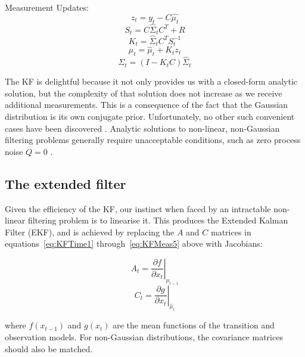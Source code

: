 Measurement Updates:
\begin{equation}
z_t = y_t - C \hat{\mu_t}
\label{eq:KFMeas1}
\end{equation}
\begin{equation}
S_t = C \hat{\Sigma}_t C^{T} + R
\label{eq:KFMeas2}
\end{equation}
\begin{equation}
K_t = \hat{\Sigma}_t C^{T} S_t^{-1}
\label{eq:KFMeas3}
\end{equation}
\begin{equation}
\mu_t = \hat{\mu}_t + K_t z_t
\label{eq:KFMeas4}
\end{equation}
\begin{equation}
\Sigma_t = (I - K_t C) \hat{\Sigma}_t
\label{eq:KFMeas5}
\end{equation}

The KF is delightful because it not only provides us with a closed-form analytic solution, but the complexity of that solution does not increase as we receive additional measurements. This is a consequence of the fact that the Gaussian distribution is its own conjugate prior. Unfortunately, no other such convenient cases have been discovered \cite{Daum2005}. Analytic solutions to non-linear, non-Gaussian filtering problems generally require unacceptable conditions, such as zero process noise $Q=0$ \cite{Daum2005}.

\subsection{The extended filter}

Given the efficiency of the KF, our instinct when faced by an intractable non-linear filtering problem is to linearise it. This produces the Extended Kalman Filter (EKF), and is achieved by replacing the $A$ and $C$ matrices in equations~\ref{eq:KFTime1} through~\ref{eq:KFMeas5} above with Jacobians:

\begin{equation}
A_t = \left . \frac{\partial f}{\partial x_t} \right \vert _{\mu_{t-1}}
\label{eq:EKF1}
\end{equation}
\begin{equation}
C_t = \left . \frac{\partial g}{\partial x_t} \right \vert _{\hat{\mu}_t}
\label{eq:EKF2}
\end{equation}

where $f(x_{t-1})$ and $g(x_t)$ are the mean functions of the transition and observation models. For non-Gaussian distributions, the covariance matrices should also be matched.



